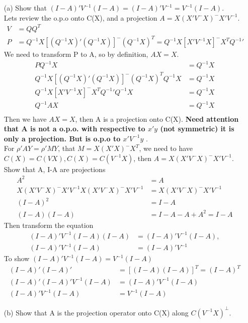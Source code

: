 \documentclass{homework}
\begin{document}
\begin{itemize}
    \item [(a)] Show that $(I-A)'V^{-1}(I-A) = (I-A)'V^{-1} = V^{-1}(I-A)$. \\
    Lets review the o.p.o onto C(X), and a projection $A =X(X'V^-X)^-X'V^{-1}$.
\begin{align*}
 V &= QQ^{T}\\
 P &= Q^{-1}X [(Q^{-1}X)' (Q^{-1}X)]^{-} (Q^{-1}X)^{T} = Q^{-1}X [X' V^{-1}X]^- X^{T} Q^{-1} '
\end{align*}     
We need to transform P to A, so by definition, $AX = X$. 
\begin{align*}
 P Q^{-1}X &= Q^{-1}X \\
 Q^{-1}X [(Q^{-1}X)' (Q^{-1}X)]^{-} (Q^{-1}X)^{T} Q^{-1}X &= Q^{-1}X\\
 Q^{-1}X [X' V^{-1}X]^{-} X^T Q^{-1}'Q^{-1}X &= Q^{-1}X\\
 Q^{-1} A X &= Q^{-1}X\\
\end{align*}  
Then we have $AX = X$, then A is a projection onto C(X). \textbf{Need attention that A is not a o.p.o. with respective to $x'y$ (not symmetric) it is only a projection. But is o.p.o to $x' V^{-1}y$ }.\\
For $\rho'A Y = \rho' MY$, that $M= X(X'X)^{-} X^{T}$, we need to have $C(X) = C(VX), C(X) = C(V^{-1}X)$, then $A =X(X'V^-X)^-X'V^{-1}$.\\
Show that A, I-A are projections
\begin{align*}
A^2 &= A\\
X(X'V^-X)^-X'V^{-1} X(X'V^-X)^-X'V^{-1} &= X(X'V^-X)^-X'V^{-1}\\
(I-A)^2 &= I-A \\
(I-A)(I-A) &= I-A-A + A^2 = I-A
\end{align*}  
Then transform the equation
\begin{align*}
(I-A)'V^{-1}(I-A)(I-A) &= (I-A)'V^{-1}(I-A), \\
(I-A)'V^{-1}(I-A) &= (I-A)'V^{-1} 
\end{align*} 
To show $(I-A)'V^{-1}(I-A) = V^{-1}(I-A)$
\begin{align*}
(I-A)'(I-A)' &= [(I-A)(I-A)]^T = (I-A)^T\\
(I-A)'(I-A)'V^{-1}(I-A) &= (I-A)'V^{-1}(I-A) \\
(I-A)'V^{-1}(I-A) &= V^{-1}(I-A) 
\end{align*} 
\item[(b)] Show that A is the projection operator onto C(X) along $C(V^{-1} X)^{\perp}$.

\end{itemize}
\end{document}
